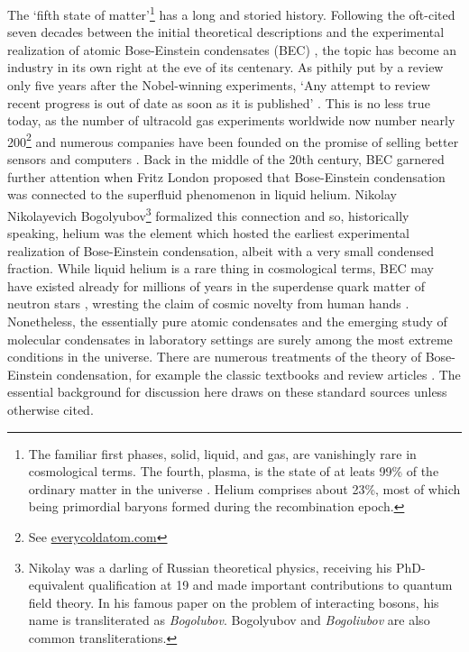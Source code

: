 	The `fifth state of matter'\footnote{The familiar first phases, solid, liquid, and gas, are vanishingly rare in cosmological terms. The fourth, plasma, is the state of at leats 99\% of the ordinary matter in the universe \cite{plasmastuff}. Helium comprises about 23\%, most of which being primordial baryons formed during the recombination epoch.}  has a long and storied history\cite{mukundanote}. Following the oft-cited seven decades between the initial theoretical descriptions and the experimental realization of atomic Bose-Einstein condensates (BEC) \cite{anderson95,davis95,bradley95}, the topic has become an industry  in its own right at the eve of its centenary. As pithily put by a review only five years after the Nobel-winning experiments, `Any attempt to review recent progress is out of date as soon as it is published' \cite{courteille01}. This is no less true today, as the number of ultracold gas experiments worldwide now number nearly 200\footnote{See \url{everycoldatom.com}} and numerous companies have been founded on the promise of selling better sensors and computers . Back in the middle of the 20th century, BEC garnered further attention when Fritz London proposed that Bose-Einstein condensation was connected to the superfluid phenomenon in liquid helium. Nikolay Nikolayevich Bogolyubov\footnote{Nikolay was a darling of Russian theoretical physics, receiving his PhD-equivalent qualification at 19 and made important contributions to quantum field theory. In his famous paper on the problem of interacting bosons, his name is transliterated as \emph{Bogolubov}. Bogolyubov and \emph{Bogoliubov} are also common transliterations.} formalized this connection and so, historically speaking, helium was the element which hosted the earliest experimental realization of Bose-Einstein condensation, albeit with a very small condensed fraction. While liquid helium is a rare thing in cosmological terms, BEC may have existed already for millions of years in the superdense quark matter of neutron stars \cite{haskell18, martin16,baym69,page11}, wresting the claim of cosmic novelty from human hands . Nonetheless, the essentially pure atomic condensates and the emerging study of molecular condensates in laboratory settings are surely among the most extreme conditions in the universe. There are numerous treatments of the theory of Bose-Einstein condensation, for example the classic textbooks \cite{PitaevskiiStringari,PethickSmith} and review articles \cite{DalfovoReview, yukalov11_basics,courteille01}. The essential background for discussion here draws on these standard sources unless otherwise cited.


